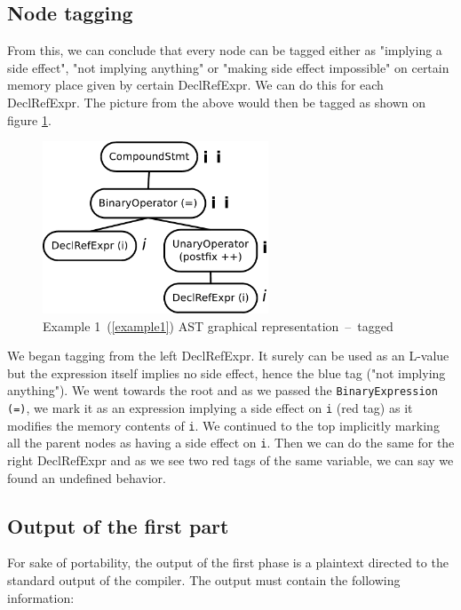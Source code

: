 \subsection{Node tagging}
From this, we can conclude that every node can be tagged either as "implying a side effect", "not implying anything" or "making side effect impossible" on certain memory place given by certain DeclRefExpr. We can do this for each DeclRefExpr. The picture from the above would then be tagged as shown on figure \ref{ASTtagged}.
\begin{figure}
    \caption{Example 1~(\ref{example1}) AST graphical representation~--~tagged}
    \label{ASTtagged}
    \centering
        \includegraphics[width=0.6\textwidth]{fig/example1G-tagged.pdf}
\end{figure}

We began tagging from the left DeclRefExpr. It surely can be used as an L-value but the expression itself implies no side effect, hence the blue tag ("not implying anything"). We went towards the root and as we passed the \verb|BinaryExpression (=)|, we mark it as an expression implying a side effect on \verb|i| (red tag) as it modifies the memory contents of \verb|i|. We continued to the top implicitly marking all the parent nodes as having a side effect on \verb|i|. Then we can do the same for the right DeclRefExpr and as we see two red tags of the same variable, we can say we found an undefined behavior.


\subsection{Output of the first part}
For sake of portability, the output of the first phase is a plaintext directed to the standard output of the compiler. The output must contain the following information:

